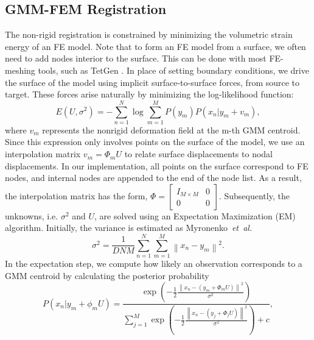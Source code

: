 \documentclass[journal]{IEEEtran}
\begin{document}
\subsection{GMM-FEM Registration}
The non-rigid registration is constrained by minimizing the volumetric strain energy of an FE model. Note that to form an FE model from a surface, we often need to add nodes interior to the surface. This can be done with most FE-meshing tools, such as TetGen \cite{Si06a}. In place of setting boundary conditions, we drive the surface of the model using implicit surface-to-surface forces, from source to target. These forces arise naturally by minimizing the log-likelihood function: 
\begin{equation} \label{eq:loglike}
E(U,\sigma^2) = -\sum_{n=1}^N\log\sum_{m=1}^MP(y_m)P(x_n|y_m+v_m),
\end{equation}
where $v_m$ represents the nonrigid deformation field at the m-th GMM centroid. Since this expression only involves points on the surface of the model, we use an interpolation matrix $v_m={\Phi_m}U$ to relate surface displacements to nodal displacements. In our implementation, all points on the surface correspond to FE nodes, and internal nodes are appended to the end of the node list. As a result, the interpolation matrix has the form, $\Phi=\begin{bmatrix} I_{M\times M} & 0\\ 0 & 0 \end{bmatrix}$.   Subsequently, the unknowns, i.e. $\sigma^2$ and $U$, are solved using an Expectation Maximization (EM) algorithm. Initially, the variance is estimated as Myronenko~\textit{et~al.}~\cite{Myronenko10a}
\begin{equation} \label{eq:initVariance}
\sigma^2 = \frac{1}{DNM}\sum_{n=1}^{N}\sum_{m=1}^{M}\left\|x_n-y_m\right\|^2.
\end{equation}
In the expectation step, we compute how likely an observation corresponds to a GMM centroid by calculating the posterior probability
\begin{equation} \label{eq:prob}
P(x_n|y_m+\phi_mU) = \frac{\exp{\left(-\frac{1}{2}\frac{\left\|x_n -(y_m+\Phi_mU)\right\|^2}{\sigma^2}\right)}}{\sum_{j=1}^M\exp{\left(-\frac{1}{2}\frac{\left\|x_n -(y_j+\Phi_jU)\right\|^2}{\sigma^2}\right)} + c},
\end{equation}
\end{document}
